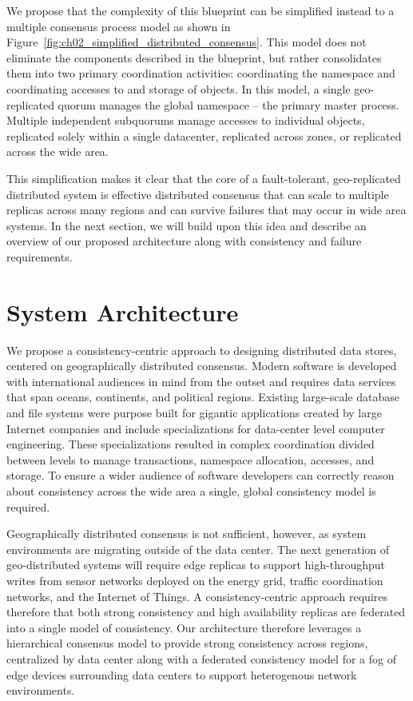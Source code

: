 We propose that the complexity of this blueprint can be simplified instead to a multiple consensus process model as shown in Figure~\ref{fig:ch02_simplified_distributed_consensus}.
This model does not eliminate the components described in the blueprint, but rather consolidates them into two primary coordination activities: coordinating the namespace and coordinating accesses to and storage of objects.
In this model, a single geo-replicated quorum manages the global namespace -- the primary master process.
Multiple independent subquorums manage accesses to individual objects, replicated solely within a single datacenter, replicated across zones, or replicated across the wide area.

This simplification makes it clear that the core of a fault-tolerant, geo-replicated distributed system is effective distributed consensus that can scale to multiple replicas across many regions and can survive failures that may occur in wide area systems.
In the next section, we will build upon this idea and describe an overview of our proposed architecture along with consistency and failure requirements.

\section{System Architecture}

We propose a consistency-centric approach to designing distributed data stores, centered on geographically distributed consensus.
Modern software is developed with international audiences in mind from the outset and requires data services that span oceans, continents, and political regions.
Existing large-scale database and file systems were purpose built for gigantic applications created by large Internet companies and include specializations for data-center level computer engineering.
These specializations resulted in complex coordination divided between levels to manage transactions, namespace allocation, accesses, and storage.
To ensure a wider audience of software developers can correctly reason about consistency across the wide area a single, global consistency model is required.

Geographically distributed consensus is not sufficient, however, as system environments are migrating outside of the data center.
The next generation of geo-distributed systems will require edge replicas to support high-throughput writes from sensor networks deployed on the energy grid, traffic coordination networks, and the Internet of Things.
A consistency-centric approach requires therefore that both strong consistency and high availability replicas are federated into a single model of consistency.
Our architecture therefore leverages a hierarchical consensus model to provide strong consistency across regions, centralized by data center along with a federated consistency model for a fog of edge devices surrounding data centers to support heterogenous network environments.


